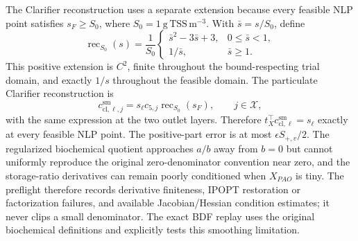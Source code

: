 \documentclass[a4paper,fleqn]{cas-sc}
\begin{document}
The Clarifier reconstruction uses a separate extension because every feasible
NLP point satisfies $s_F\geq S_0$, where
$S_0=1\ \mathrm{g\,TSS\,m^{-3}}$. With $\bar s=s/S_0$, define
\begin{equation}
\operatorname{rec}_{S_0}(s)=\frac1{S_0}
\begin{cases}
\bar s^2-3\bar s+3,&0\leq\bar s<1,\\
1/\bar s,&\bar s\geq1.
\end{cases}
\end{equation}
This positive extension is $C^2$, finite throughout the bound-respecting
trial domain, and exactly $1/s$ throughout the feasible domain. The particulate
Clarifier reconstruction is
\begin{equation}
c_{\mathrm{cl},\ell,j}^{\mathrm{sm}}
=s_\ell c_{5,j}\operatorname{rec}_{S_0}(s_F),
\qquad j\in\mathcal X,
\end{equation}
with the same expression at the two outlet layers. Therefore
$t_X^\top c_{\mathrm{cl},\ell}^{\mathrm{sm}}=s_\ell$ exactly at every feasible
NLP point. The positive-part error is at most $\epsilon S_{+,v}/2$. The regularized biochemical quotient approaches $a/b$ away from $b=0$ but cannot uniformly reproduce the original zero-denominator convention near zero, and the storage-ratio derivatives can remain poorly conditioned when $X_{PAO}$ is tiny. The preflight therefore records derivative finiteness, IPOPT restoration or factorization failures, and available Jacobian/Hessian condition estimates; it never clips a small denominator. The exact BDF replay uses the original biochemical definitions and explicitly tests this smoothing limitation.
\end{document}

